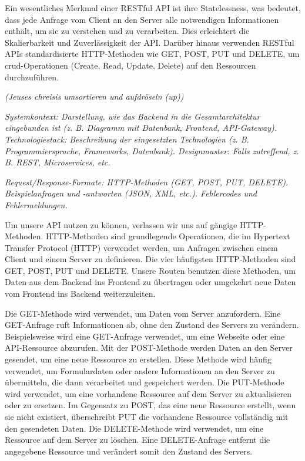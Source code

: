 \documentclass[a4paper,12pt]{article}
\begin{document}
Ein wesentliches Merkmal einer RESTful API ist ihre Statelessness, was bedeutet, dass jede Anfrage vom Client an den Server alle notwendigen Informationen enthält, um sie zu verstehen und zu verarbeiten. Dies erleichtert die Skalierbarkeit und Zuverlässigkeit der API. Darüber hinaus verwenden RESTful APIs standardisierte HTTP-Methoden wie GET, POST, PUT und DELETE, um \gls{crud}-Operationen (Create, Read, Update, Delete) auf den Ressourcen durchzuführen. 

\textit{(Jeuses chreisis umsortieren und aufdröseln (up))}

\textit{Systemkontext: Darstellung, wie das Backend in die Gesamtarchitektur
eingebunden ist (z. B. Diagramm mit Datenbank, Frontend, API-Gateway).
Technologiestack: Beschreibung der eingesetzten Technologien (z. B.
Programmiersprache, Frameworks, Datenbank).
Designmuster: Falls zutreffend, z. B. REST, Microservices, etc. }



\textit{Request/Response-Formate: HTTP-Methoden (GET, POST, PUT, DELETE).
Beispielanfragen und -antworten (JSON, XML, etc.).  Fehlercodes und
Fehlermeldungen.}

Um unsere API nutzen zu können, verlassen wir uns auf gängige HTTP-Methoden. HTTP-Methoden sind grundlegende Operationen, die im Hypertext Transfer Protocol (HTTP) verwendet werden, um Anfragen zwischen einem Client und einem Server zu definieren. Die vier häufigsten HTTP-Methoden sind GET, POST, PUT und DELETE. Unsere Routen benutzen diese Methoden, um Daten aus dem Backend ins Frontend zu übertragen oder umgekehrt neue Daten vom Frontend ins Backend weiterzuleiten.
 
Die GET-Methode wird verwendet, um Daten vom Server anzufordern. Eine GET-Anfrage ruft Informationen ab, ohne den Zustand des Servers zu verändern. Beispielsweise wird eine GET-Anfrage verwendet, um eine Webseite oder eine API-Ressource abzurufen.
Mit der POST-Methode werden Daten an den Server gesendet, um eine neue Ressource zu erstellen. Diese Methode wird häufig verwendet, um Formulardaten oder andere Informationen an den Server zu übermitteln, die dann verarbeitet und gespeichert werden.
Die PUT-Methode wird verwendet, um eine vorhandene Ressource auf dem Server zu aktualisieren oder zu ersetzen. Im Gegensatz zu POST, das eine neue Ressource erstellt, wenn sie nicht existiert, überschreibt PUT die vorhandene Ressource vollständig mit den gesendeten Daten.
Die DELETE-Methode wird verwendet, um eine Ressource auf dem Server zu löschen. Eine DELETE-Anfrage entfernt die angegebene Ressource und verändert somit den Zustand des Servers.
\end{document}
